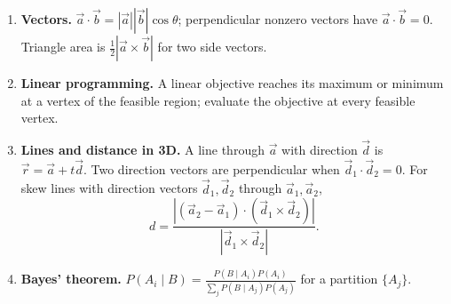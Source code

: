 \begin{enumerate}[label=\textbf{1.1.\arabic*.},ref=1.1.\arabic*]
\begin{equation*}
\end{equation*}
For independent events, $P(A\cap B)=P(A)P(B)$.
\item \label{formula-1-1-9} \textbf{Vectors.} $\vec a\cdot\vec b=|\vec a||\vec b|\cos\theta$; perpendicular nonzero vectors have $\vec a\cdot\vec b=0$. Triangle area is $\frac12|\vec a\times\vec b|$ for two side vectors.
\item \label{formula-1-1-10} \textbf{Linear programming.} A linear objective reaches its maximum or minimum at a vertex of the feasible region; evaluate the objective at every feasible vertex.
\item \label{formula-1-1-11} \textbf{Lines and distance in 3D.} A line through $\vec a$ with direction $\vec d$ is $\vec r=\vec a+t\vec d$. Two direction vectors are perpendicular when $\vec d_1\cdot\vec d_2=0$. For skew lines with direction vectors $\vec d_1,\vec d_2$ through $\vec a_1,\vec a_2$,
\begin{equation*}\tag{1.1.11.1}
d=\frac{|(\vec a_2-\vec a_1)\cdot(\vec d_1\times\vec d_2)|}{|\vec d_1\times\vec d_2|}.
\end{equation*}
\item \label{formula-1-1-12} \textbf{Bayes' theorem.} $P(A_i\mid B)=\frac{P(B\mid A_i)P(A_i)}{\sum_jP(B\mid A_j)P(A_j)}$ for a partition $\{A_j\}$.
\end{enumerate}
